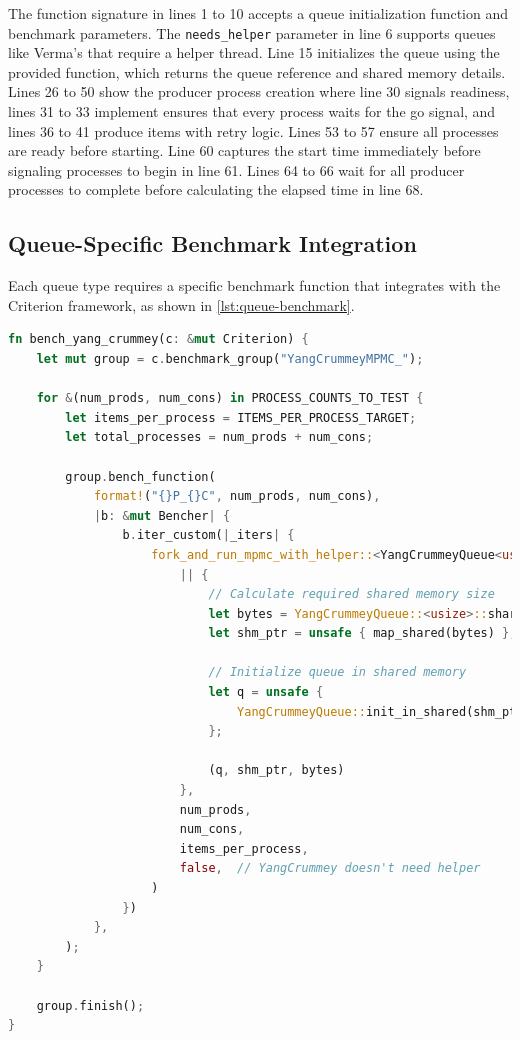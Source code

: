 The function signature in lines 1 to 10 accepts a queue initialization function and benchmark parameters. The \texttt{needs\_helper} parameter in line 6 supports queues like Verma's that require a helper thread. Line 15 initializes the queue using the provided function, which returns the queue reference and shared memory details. Lines 26 to 50 show the producer process creation where line 30 signals readiness, lines 31 to 33 implement ensures that every process waits for the go signal, and lines 36 to 41 produce items with retry logic. Lines 53 to 57 ensure all processes are ready before starting. Line 60 captures the start time immediately before signaling processes to begin in line 61. Lines 64 to 66 wait for all producer processes to complete before calculating the elapsed time in line 68.

\subsection{Queue-Specific Benchmark Integration}

Each queue type requires a specific benchmark function that integrates with the Criterion framework, as shown in \cref{lst:queue-benchmark}.

\begin{lstlisting}[language=Rust, style=boxed, caption={Queue-specific benchmark function}, label={lst:queue-benchmark}]
fn bench_yang_crummey(c: &mut Criterion) {
    let mut group = c.benchmark_group("YangCrummeyMPMC_");

    for &(num_prods, num_cons) in PROCESS_COUNTS_TO_TEST {
        let items_per_process = ITEMS_PER_PROCESS_TARGET;
        let total_processes = num_prods + num_cons;

        group.bench_function(
            format!("{}P_{}C", num_prods, num_cons),
            |b: &mut Bencher| {
                b.iter_custom(|_iters| {
                    fork_and_run_mpmc_with_helper::<YangCrummeyQueue<usize>, _>(
                        || {
                            // Calculate required shared memory size
                            let bytes = YangCrummeyQueue::<usize>::shared_size(total_processes);
                            let shm_ptr = unsafe { map_shared(bytes) };
                            
                            // Initialize queue in shared memory
                            let q = unsafe {
                                YangCrummeyQueue::init_in_shared(shm_ptr, total_processes)
                            };
                            
                            (q, shm_ptr, bytes)
                        },
                        num_prods,
                        num_cons,
                        items_per_process,
                        false,  // YangCrummey doesn't need helper
                    )
                })
            },
        );
    }

    group.finish();
}
\end{lstlisting}

